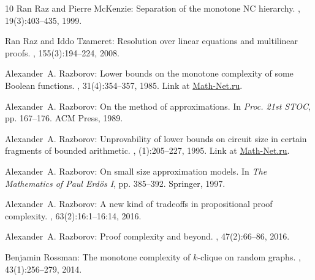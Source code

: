 \documentclass[11pt]{article}
\numberwithin{equation}{section}
\theoremstyle{definition}
\theoremstyle{plain}
\begin{document}
\begin{thebibliography}{10}
{\sc Ran Raz and Pierre McKenzie}: Separation of the monotone {NC} hierarchy.
, 19(3):403--435, 1999.
\newblock [\epfmtdoi{10.1007/s004930050062}]

{\sc Ran Raz and Iddo Tzameret}: Resolution over linear equations and
  multilinear proofs.
, 155(3):194--224, 2008.

{\sc Alexander~A. Razborov}: Lower bounds on the monotone complexity of some
  {Boolean} functions.
, 31(4):354--357, 1985.
\newblock Link at
  \href{http://www.mathnet.ru/php/archive.phtml?wshow=paper&jrnid=dan&paperid=9192&option_lang=eng}{Math-Net.ru}.

{\sc Alexander~A. Razborov}: On the method of approximations.
\newblock In {\em Proc. 21st STOC}, pp. 167--176. ACM Press, 1989.
\newblock [\epfmtdoi{10.1145/73007.73023}]

{\sc Alexander~A. Razborov}: Unprovability of lower bounds on circuit size in
  certain fragments of bounded arithmetic.
, (1):205--227, 1995.
\newblock Link at
  \href{http://www.mathnet.ru/php/archive.phtml?wshow=paper&jrnid=im&paperid=9&option_lang=eng}{Math-Net.ru}.

{\sc Alexander~A. Razborov}: On small size approximation models.
\newblock In {\em The Mathematics of Paul Erd{\"o}s I}, pp. 385--392. Springer,
  1997.
\newblock [\epfmtdoi{10.1007/978-3-642-60408-9\_28}]

{\sc Alexander~A. Razborov}: A new kind of tradeoffs in propositional proof
  complexity.
, 63(2):16:1--16:14, 2016.
\newblock [\epfmtdoi{10.1145/2858790}]

{\sc Alexander~A. Razborov}: Proof complexity and beyond.
, 47(2):66--86, 2016.
\newblock [\epfmtdoi{10.1145/2951860.2951875}]

{\sc Benjamin Rossman}: The monotone complexity of $k$-clique on random graphs.
, 43(1):256--279, 2014.
\newblock [\epfmtdoi{10.1137/110839059}]


\end{thebibliography}
\end{document}

